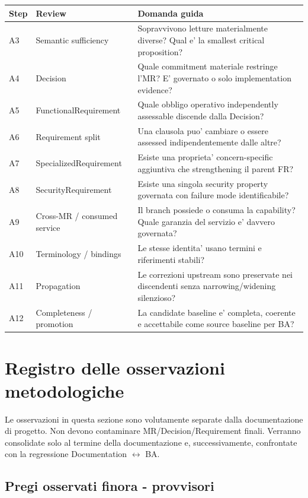 \documentclass[11pt,a4paper]{article}
\begin{document}
\begin{longtable}{L{17mm}L{39mm}L{90mm}}
\toprule
\textbf{Step} & \textbf{Review} & \textbf{Domanda guida} \\
\midrule
\endhead
A3 & Semantic sufficiency & Sopravvivono letture materialmente diverse? Qual e' la smallest critical proposition? \\
A4 & Decision & Quale commitment materiale restringe l'MR? E' governato o solo implementation evidence? \\
A5 & FunctionalRequirement & Quale obbligo operativo independently assessable discende dalla Decision? \\
A6 & Requirement split & Una clausola puo' cambiare o essere assessed indipendentemente dalle altre? \\
A7 & SpecializedRequirement & Esiste una proprieta' concern-specific aggiuntiva che strengthening il parent FR? \\
A8 & SecurityRequirement & Esiste una singola security property governata con failure mode identificabile? \\
A9 & Cross-MR / consumed service & Il branch possiede o consuma la capability? Quale garanzia del servizio e' davvero governata? \\
A10 & Terminology / bindings & Le stesse identita' usano termini e riferimenti stabili? \\
A11 & Propagation & Le correzioni upstream sono preservate nei discendenti senza narrowing/widening silenzioso? \\
A12 & Completeness / promotion & La candidate baseline e' completa, coerente e accettabile come source baseline per BA? \\
\bottomrule
\end{longtable}

\section{Registro delle osservazioni metodologiche}

Le osservazioni in questa sezione sono volutamente separate dalla documentazione di progetto. Non devono contaminare MR/Decision/Requirement finali. Verranno consolidate solo al termine della documentazione e, successivamente, confrontate con la regressione Documentation $\leftrightarrow$ BA.

\subsection{Pregi osservati finora - provvisori}
\end{document}
